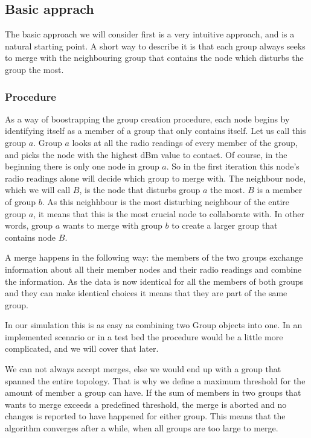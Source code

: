 \subsection{Basic apprach}
The basic approach we will consider first is a very intuitive approach, and is a natural starting point. A short way to describe it is that each group always seeks
to merge with the neighbouring group that contains the node which disturbs the group the most. 

\subsubsection{Procedure}
As a way of boostrapping the group creation procedure, each node begins by identifying itself as a member of a group that only contains itself. 
Let us call this group $a$. Group $a$ looks at all the radio readings of every member of the group, and picks the node with the highest dBm value
to contact. Of course, in the beginning there is only one node in group $a$. So in the first iteration this node's radio readings alone will decide which group to merge with. 
The neighbour node, which we will call $B$, is the node that disturbs group $a$ the most. $B$ is a member of group $b$.
As this neighhbour is the most disturbing neighbour of the entire group $a$, it means that this is the most crucial node to collaborate with.
In other words, group $a$ wants to merge with group $b$ to create a larger group that contains node $B$.

A merge happens in the following way: the members of the two groups exchange information about all their member nodes and their radio readings and combine the information.
As the data is now identical for all the members of both groups and they can make identical choices it means that they are part of the same group. 

In our simulation this is as easy as combining two Group objects into one. In an implemented scenario or in a test bed the procedure would be a little more complicated, and
we will cover that later. 

We can not always accept merges, else we would end up with a group that spanned the entire topology. That is why we define a maximum threshold for the amount of member a group can have.
If the sum of members in two groups that wants to merge exceeds a predefined threshold, the merge is aborted and no changes is reported to have happened for either group. 
This means that the algorithm converges after a while, when all groups are too large to merge.
 
